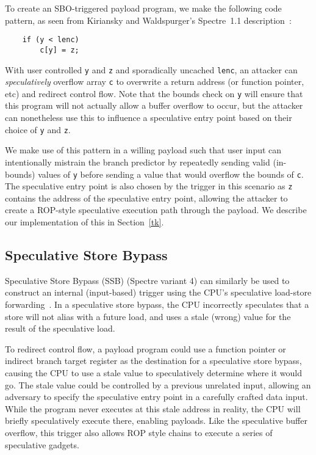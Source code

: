 
To create an SBO-triggered payload program, we make the following code pattern,
as seen from Kiriansky and Waldspurger's Spectre~1.1
description~\cite{kiransky2018speculative}:
\begin{lstlisting}
    if (y < lenc)
        c[y] = z;
\end{lstlisting}
With user controlled 
\texttt{y} and \texttt{z} and sporadically uncached \texttt{lenc}, an attacker 
can \textit{speculatively} overflow array \texttt{c}
to overwrite a return address (or function pointer, etc) and redirect control
flow. Note that the bounds check on \texttt{y} will ensure that this program
will not actually allow a buffer overflow to occur, but the attacker can
nonetheless use this to influence a speculative entry point based on their
choice of \texttt{y} and \texttt{z}.


We make use of this pattern in a willing payload such that user input can
intentionally mistrain the branch predictor by repeatedly sending valid
(in-bounds) values of \texttt{y} before sending a value that would overflow the
bounds of \texttt{c}. The speculative entry point is also chosen by the trigger
in this scenario as \texttt{z} contains the address of the speculative entry
point, allowing the attacker to create a ROP-style speculative execution path
through the payload. We describe our implementation of this in Section~\ref{tk}.


\subsection{Speculative Store Bypass}

Speculative Store Bypass (SSB) (Spectre variant 4) can similarly be used to
construct an internal (input-based) trigger using the CPU's speculative
load-store forwarding~\cite{spec-store-bypass}. In a speculative store bypass,
the CPU incorrectly speculates that a store will not alias with a future load,
and uses a stale (wrong) value for the result of the speculative load.


To redirect control flow, a payload program could use a function pointer or
indirect branch target register as the destination for a speculative store
bypass, causing the CPU to use a stale value to speculatively determine where it
would go. The stale value could be controlled by a previous unrelated input,
allowing an adversary to specify the speculative entry point in a carefully
crafted data input. While the program never
executes at this stale address in reality, the CPU will briefly speculatively
execute there, enabling \speculake payloads. Like the speculative buffer
overflow, this trigger also allows ROP style chains to execute a series of
speculative gadgets.


